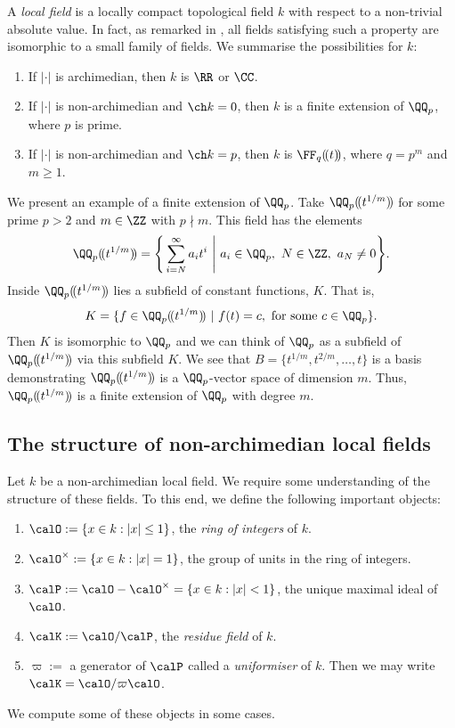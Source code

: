 \documentclass[11pt]{amsart}
\theoremstyle{remark}
\begin{document}
A \emph{local field} is a locally compact topological field $k$ with respect to a non-trivial absolute value.
In fact, as remarked in \cite{MilneANT}, all fields satisfying such a property are isomorphic to a small family of fields.
We summarise the possibilities for $k$:
\begin{enumerate}[\itshape(i)]
	\item If $|\cdot|$ is archimedian, then $k$ is $\RR$ or $\CC$.
	\item If $|\cdot|$ is non-archimedian and $\ch k=0$, then $k$ is a finite extension of $\QQ_p$, where $p$ is prime.
	\item If $|\cdot|$ is non-archimedian and $\ch k = p$, then $k$ is $\FF_q(\!(t)\!)$, where $q=p^m$ and $m\geq 1$.
\end{enumerate}
We present an example of a finite extension of $\QQ_p$.
Take $\QQ_p(\!(t^{1/m})\!)$ for some prime $p>2$ and $m\in\ZZ$ with $p\nmid m$.
This field has the elements
\[
	\QQ_p(\!(t^{1/m})\!) = \Bigg\{\sum_{i=N}^\infty a_it^i\ \Bigg|\ a_i\in\QQ_p,\ N\in\ZZ,\ a_N\neq 0 \Bigg\}.
\]
Inside $\QQ_p(\!(t^{1/m})\!)$ lies a subfield of constant functions, $K$.
That is,
\[
	K = \{f \in  \QQ_p(\!(t^{1/m})\!)\ |\ f(t) = c,\ \text{for some}\ c\in\QQ_p\}.
\]
Then $K$ is isomorphic to $\QQ_p$ and we can think of $\QQ_p$ as a subfield of $\QQ_p(\!(t^{1/m})\!)$ via this subfield $K$.
We see that $B=\{t^{1/m},t^{2/m},\ldots,t\}$ is a basis demonstrating $\QQ_p(\!(t^{1/m})\!)$ is a $\QQ_p$-vector space of dimension $m$.
Thus, $\QQ_p(\!(t^{1/m})\!)$ is a finite extension of $\QQ_p$ with degree $m$.


\subsection{The structure of non-archimedian local fields}\label{Section5.2}
Let $k$ be a non-archimedian local field.
We require some understanding of the structure of these fields.
To this end, we define the following important objects:
\begin{enumerate}[\itshape(i)]
	\item $\calO := \{x\in k:|x|\leq 1\}$, the \emph{ring of integers} of $k$.
	\item $\calO^\times := \{x\in k: |x|=1\}$, the group of units in the ring of integers.
	\item $\calP := \calO-\calO^\times = \{x\in k: |x|<1\}$, the unique maximal ideal of $\calO$.
	\item $\calK := \calO/\calP$, the \emph{residue field} of $k$.
	\item $\varpi :=$ a generator of $\calP$ called a \emph{uniformiser} of $k$.
	      Then we may write $\calK = \calO/\varpi\calO$.
\end{enumerate}
We compute some of these objects in some cases.
\end{document}
